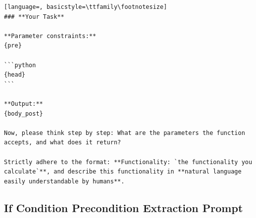 \documentclass[sigconf]{acmart}
\begin{document}
\begin{tcolorbox}[ colback=gray!10, colframe=black, arc=5pt]
\begin{lstlisting}[language=, basicstyle=\ttfamily\footnotesize]
### **Your Task**

**Parameter constraints:**  
{pre}

```python
{head}
```

**Output:**  
{body_post}

Now, please think step by step: What are the parameters the function accepts, and what does it return?

Strictly adhere to the format: **Functionality: `the functionality you calculate`**, and describe this functionality in **natural language easily understandable by humans**.

\end{lstlisting}
\end{tcolorbox}


\subsection{If Condition Precondition Extraction Prompt}
\label{if_pre_prompt}
\end{document}
